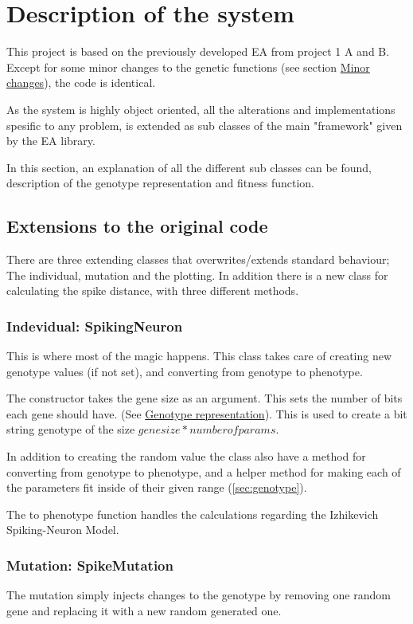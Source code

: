 \section{Description of the system}
\label{sec:descsys}

This project is based on the previously developed EA from project 1 A and B. Except for some minor changes 
to the genetic functions (see section \hyperref[sec:geneticchanges]{Minor changes}), the code is identical.

As the system is highly object oriented, all the alterations and implementations spesific to any problem,
is extended as sub classes of the main "framework" given by the EA library. 

In this section, an explanation of all the different sub classes can be found, description of the genotype
representation and fitness function. 

\subsection{Extensions to the original code}
\label{sec:extensions}

There are three extending classes that overwrites/extends standard behaviour; The individual,
mutation and the plotting. In addition there is a new class for calculating the spike distance, with 
three different methods.

\subsubsection{Indevidual: SpikingNeuron}

This is where most of the magic happens. This class takes care of creating new genotype values (if not set),
and converting from genotype to phenotype. 

The constructor takes the gene size as an argument. This sets the number of bits each gene should have. 
(See \hyperref[sec:genotype]{Genotype representation}). This is used to create a bit string genotype of the size 
$gene size * number of params$. 

In addition to creating the random value the class also have a method for converting from genotype
to phenotype, and a helper method for making each of the parameters fit inside of their given range 
(\autoref{sec:genotype}). 

The to phenotype function handles the calculations regarding the Izhikevich Spiking-Neuron Model. 

\subsubsection{Mutation: SpikeMutation}
The mutation simply injects changes to the genotype by removing one random gene and replacing it
with a new random generated one. 

